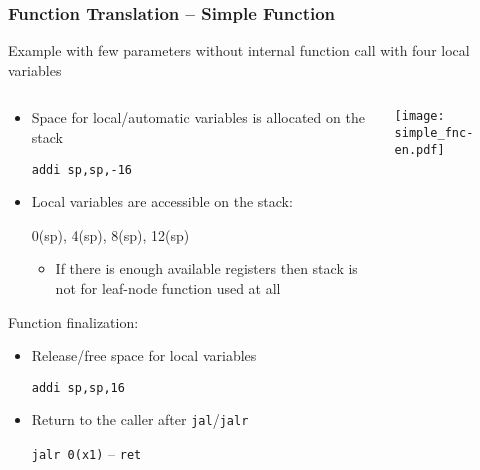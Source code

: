 \documentclass{beamer}
\begin{document}
\begin{frame}
\frametitle{Function Translation -- Simple Function}

Example with few parameters without internal function call with four local variables
\begin{columns}
\begin{column}{0.65\textwidth}
\begin{itemize}
 \item Space for local/automatic variables is allocated on the stack
 
 \texttt{addi  sp,sp,-16}
 \item Local variables are accessible on the stack:
 
 0(sp), 4(sp), 8(sp), 12(sp)
\begin{itemize}
 \item If there is enough available registers then stack is not for leaf-node function used at all
\end{itemize}
\end{itemize}

Function finalization:
\begin{itemize}
 \item Release/free space for local variables
 
 \texttt{addi  sp,sp,16}
 \item Return to the caller after \texttt{jal}/\texttt{jalr}
 
 \texttt{jalr 0(x1)} -- \texttt{ret} 
\end{itemize}
\end{column}
\begin{column}{0.35\textwidth}  
\texttt{[image: simple\_fnc-en.pdf]}
\end{column}
\end{columns}

\end{frame}
\end{document}
